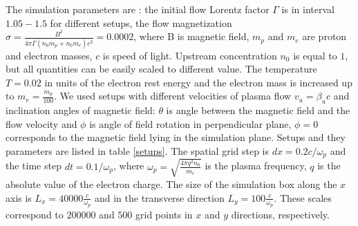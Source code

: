 \documentclass[a4paper]{jpconf}
\begin{document}
The simulation parameters are : the initial flow Lorentz factor $\Gamma$ is in interval $1.05-1.5$ for different setups, the flow magnetization $\sigma = \frac{B^2}{4\pi\Gamma (n_0 m_p + n_0 m_e) c^2} = 0.0002$, where B is magnetic field, $m_p$ and $m_e$ are proton and electron masses, $c$ is speed of light. Upstream concentration $n_0$ is equal to $1$, but all quantities can be easily scaled to different value. The temperature $T = 0.02$ in units of the electron rest energy and the electron mass is increased up to $m_e = \frac{m_p}{100}$. We used setups with different velocities of plasma flow $v_u = \beta_u c$ and inclination angles of magnetic field: $\theta$ is angle between the magnetic field and the flow velocity and $\phi$ is angle of field rotation in perpendicular plane, $\phi=0$ corresponds to the magnetic field lying in the simulation plane. Setups and they parameters are listed in table \ref{setups}. The spatial grid step is $dx = 0.2 c/{\omega_p}$ and the time step $dt = 0.1/{\omega_p}$, where $\omega_p = \sqrt{\frac{4\pi q^2 n_0}{m_e}}$ is the plasma frequency, $\displaystyle q$ is the
absolute value of the electron charge. The size of the simulation box along the $x$ axis is $L_x = 40000\frac{c}{\omega_p}$ and in the transverse direction $L_y = 100\frac{c}{\omega_p}$. These scales correspond to $200000$ and $500$ grid points in $x$ and $y$ directions, respectively. 
\end{document}
